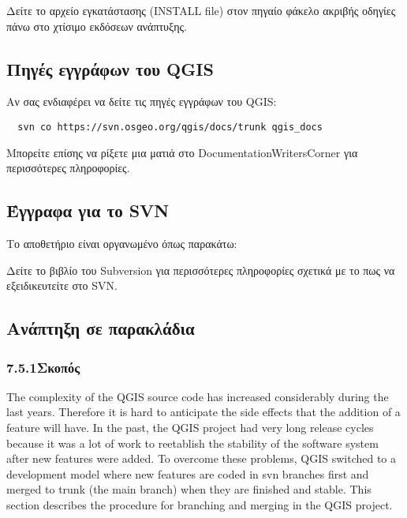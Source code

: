 Δείτε το αρχείο εγκατάστασης (ΙNSTALL file) στον πηγαίο φάκελο ακριβής οδηγίες πάνω στο χτίσιμο εκδόσεων ανάπτυξης. 

\hypertarget{toc32}{}
\subsection{Πηγές εγγράφων του QGIS}
Αν σας ενδιαφέρει να δείτε τις πηγές εγγράφων του QGIS:

\begin{verbatim}
  svn co https://svn.osgeo.org/qgis/docs/trunk qgis_docs
\end{verbatim}

Μπορείτε επίσης να ρίξετε μια ματιά στο DocumentationWritersCorner για περισσότερες πληροφορίες.

\hypertarget{toc33}{}
\subsection{Έγγραφα για το SVN}
Το αποθετήριο είναι οργανωμένο όπως παρακάτω:


Δείτε το βιβλίο του Subversion 
για περισσότερες πληροφορίες σχετικά με το πως να εξειδικευτείτε στο SVN.

\hypertarget{toc34}{}
\subsection{Ανάπτηξη σε παρακλάδια}
\hypertarget{toc35}{}
\subsubsection{7.5.1Σκοπός}
The complexity of the QGIS source code has increased considerably during the
last years. Therefore it is hard to anticipate the side effects that the
addition of a feature will have. In the past, the QGIS project had very long
release cycles because it was a lot of work to reetablish the stability of the
software system after new features were added. To overcome these problems, QGIS
switched to a development model where new features are coded in svn branches
first and merged to trunk (the main branch) when they are finished and stable.
This section describes the procedure for branching and merging in the QGIS
project.

\hypertarget{toc36}{}
